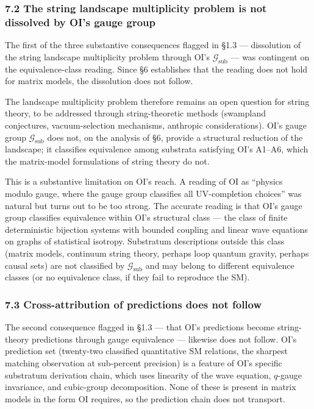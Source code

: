 \documentclass[
]{article}
\begin{document}
\hypertarget{the-string-landscape-multiplicity-problem-is-not-dissolved-by-ois-gauge-group}{%
\subsubsection{7.2 The string landscape multiplicity problem is not
dissolved by OI's gauge
group}\label{the-string-landscape-multiplicity-problem-is-not-dissolved-by-ois-gauge-group}}

The first of the three substantive consequences flagged in §1.3 ---
dissolution of the string landscape multiplicity problem through OI's
\(\mathcal{G}_{\text{sub}}\) --- was contingent on the equivalence-class
reading. Since §6 establishes that the reading does not hold for matrix
models, the dissolution does not follow.

The landscape multiplicity problem therefore remains an open question
for string theory, to be addressed through string-theoretic methods
(swampland conjectures, vacuum-selection mechanisms, anthropic
considerations). OI's gauge group \(\mathcal{G}_{\text{sub}}\) does not,
on the analysis of §6, provide a structural reduction of the landscape;
it classifies equivalence among substrata satisfying OI's A1--A6, which
the matrix-model formulations of string theory do not.

This is a substantive limitation on OI's reach. A reading of OI as
``physics modulo gauge, where the gauge group classifies all
UV-completion choices'' was natural but turns out to be too strong. The
accurate reading is that OI's gauge group classifies equivalence within
OI's structural class --- the class of finite deterministic bijection
systems with bounded coupling and linear wave equations on graphs of
statistical isotropy. Substratum descriptions outside this class (matrix
models, continuum string theory, perhaps loop quantum gravity, perhaps
causal sets) are not classified by \(\mathcal{G}_{\text{sub}}\) and may
belong to different equivalence classes (or no equivalence class, if
they fail to reproduce the SM).

\hypertarget{cross-attribution-of-predictions-does-not-follow}{%
\subsubsection{7.3 Cross-attribution of predictions does not
follow}\label{cross-attribution-of-predictions-does-not-follow}}

The second consequence flagged in §1.3 --- that OI's predictions become
string-theory predictions through gauge equivalence --- likewise does
not follow. OI's prediction set (twenty-two classified quantitative SM
relations, the sharpest matching observation at sub-percent precision)
is a feature of OI's specific substratum derivation chain, which uses
linearity of the wave equation, \(q\)-gauge invariance, and cubic-group
decomposition. None of these is present in matrix models in the form OI
requires, so the prediction chain does not transport.
\end{document}
